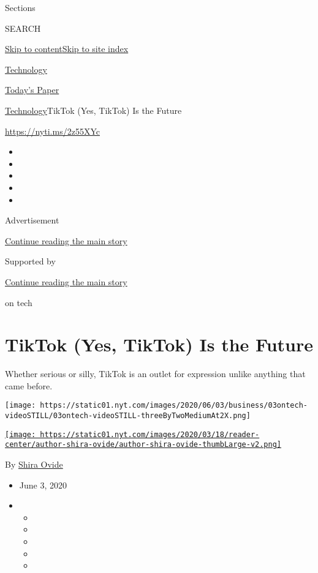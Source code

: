 Sections

SEARCH

\protect\hyperlink{site-content}{Skip to
content}\protect\hyperlink{site-index}{Skip to site index}

\href{https://www.nytimes.com/section/technology}{Technology}

\href{https://myaccount.nytimes.com/auth/login?response_type=cookie\&client_id=vi}{}

\href{https://www.nytimes.com/section/todayspaper}{Today's Paper}

\href{/section/technology}{Technology}\textbar{}TikTok (Yes, TikTok) Is
the Future

\url{https://nyti.ms/2z55XYc}

\begin{itemize}
\item
\item
\item
\item
\item
\end{itemize}

Advertisement

\protect\hyperlink{after-top}{Continue reading the main story}

Supported by

\protect\hyperlink{after-sponsor}{Continue reading the main story}

on tech

\hypertarget{tiktok-yes-tiktok-is-the-future}{%
\section{TikTok (Yes, TikTok) Is the
Future}\label{tiktok-yes-tiktok-is-the-future}}

Whether serious or silly, TikTok is an outlet for expression unlike
anything that came before.

\texttt{[image: https://static01.nyt.com/images/2020/06/03/business/03ontech-videoSTILL/03ontech-videoSTILL-threeByTwoMediumAt2X.png]}

\href{https://www.nytimes.com/by/shira-ovide}{\texttt{[image: https://static01.nyt.com/images/2020/03/18/reader-center/author-shira-ovide/author-shira-ovide-thumbLarge-v2.png]}}

By \href{https://www.nytimes.com/by/shira-ovide}{Shira Ovide}

\begin{itemize}
\item
  June 3, 2020
\item
  \begin{itemize}
  \item
  \item
  \item
  \item
  \item
  \end{itemize}
\end{itemize}

